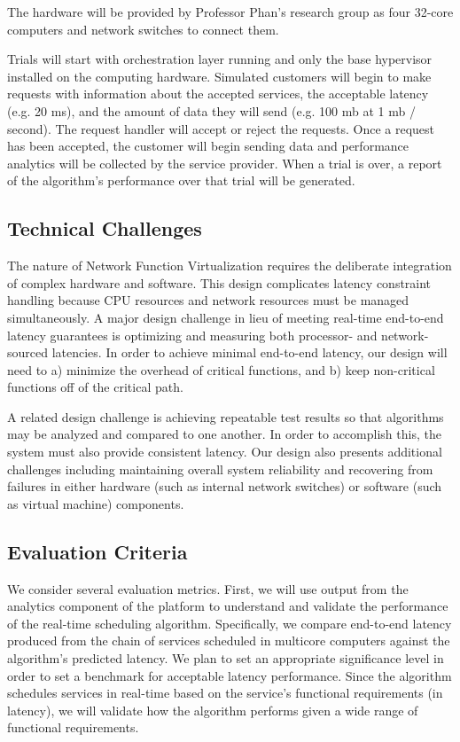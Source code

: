 \documentclass{sig-alternate}
\begin{document}
The hardware will be provided by Professor Phan’s research group as four 32-core computers and network switches to connect them.

Trials will start with orchestration layer running and only the base hypervisor installed on the computing hardware. Simulated customers will begin to make requests with information about the accepted services, the acceptable latency (e.g. 20 ms), and the amount of data they will send (e.g. 100 mb at 1 mb / second). The request handler will accept or reject the requests. Once a request has been accepted, the customer will begin sending data and performance analytics will be collected by the service provider. When a trial is over, a report of the algorithm’s performance over that trial will be generated.


\subsection{Technical Challenges}
\label{subsec:tech_challenges}
The nature of Network Function Virtualization requires the deliberate integration of complex hardware and software. This design complicates latency constraint handling because CPU resources and network resources must be managed simultaneously. A major design challenge in lieu of meeting real-time end-to-end latency guarantees is optimizing and measuring both processor- and network-sourced latencies. In order to achieve minimal end-to-end latency, our design will need to a) minimize the overhead of critical functions, and b) keep non-critical functions off of the critical path.

A related design challenge is achieving repeatable test results so that algorithms may be analyzed and compared to one another. In order to accomplish this, the system must also provide consistent latency. Our design also presents additional challenges including maintaining overall system reliability and recovering from failures in either hardware (such as internal network switches) or software (such as virtual machine) components.

\subsection{Evaluation Criteria}
\label{subsec:eval_criteria}
We consider several evaluation metrics. First, we will use output from the analytics component of the platform to understand and validate the performance of the real-time scheduling algorithm. Specifically, we compare end-to-end latency produced from the chain of services scheduled in multicore computers against the algorithm’s predicted latency. We plan to set an appropriate significance level in order to set a benchmark for acceptable latency performance. Since the algorithm schedules services in real-time based on the service’s functional requirements (in latency), we will validate how the algorithm performs given a wide range of functional requirements.
\end{document}
